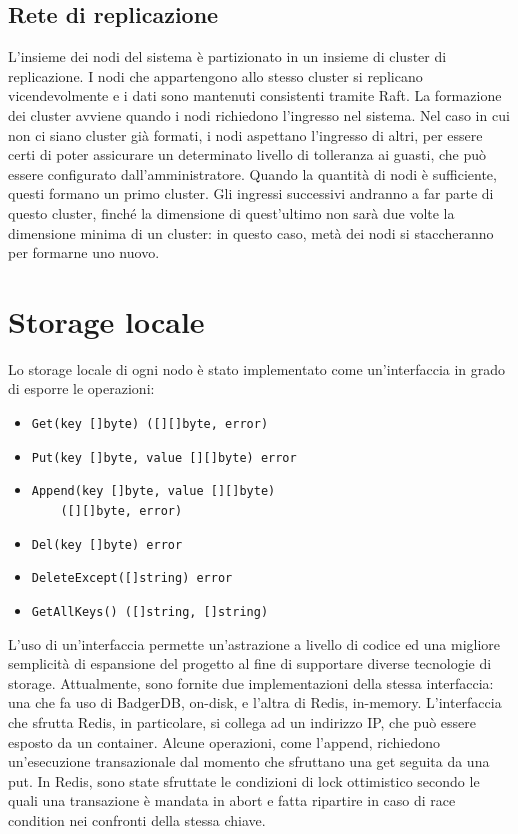 \documentclass[conference]{IEEEtran}
\begin{document}
\subsection{Rete di replicazione}
L'insieme dei nodi del sistema è partizionato in un insieme di cluster di replicazione. I nodi che appartengono allo
stesso cluster si replicano vicendevolmente e i dati sono mantenuti consistenti tramite Raft. La formazione dei cluster
avviene quando i nodi richiedono l'ingresso nel sistema. Nel caso in cui non ci siano cluster già formati, i nodi aspettano
l'ingresso di altri, per essere certi di poter assicurare un determinato livello di tolleranza ai guasti, che può essere
configurato dall'amministratore. Quando la quantità di nodi è sufficiente, questi formano un primo cluster. Gli ingressi successivi
andranno a far parte di questo cluster, finché la dimensione di quest'ultimo non sarà due volte la dimensione minima di un
cluster: in questo caso, metà dei nodi si staccheranno per formarne uno nuovo.

\section{Storage locale}
Lo storage locale di ogni nodo è stato implementato come un'interfaccia in grado di esporre le operazioni:
\begin{itemize}
  \item {\small{\verb!Get(key []byte) ([][]byte, error)!}}
  \item {\small{\verb!Put(key []byte, value [][]byte) error!}}
  \item {\small{\verb!Append(key []byte, value [][]byte)!\\ \verb!    ([][]byte, error)!}}
  \item {\small{\verb!Del(key []byte) error!}}
  \item {\small{\verb!DeleteExcept([]string) error!}}
  \item {\small{\verb!GetAllKeys() ([]string, []string)!}}
\end{itemize}
L'uso di un'interfaccia permette un'astrazione a livello di codice ed una migliore semplicità di espansione del progetto
al fine di supportare diverse tecnologie di storage. Attualmente, sono fornite due implementazioni della stessa interfaccia:
una che fa uso di BadgerDB, on-disk, e l'altra di Redis, in-memory. L'interfaccia che sfrutta Redis, in particolare, si collega ad un indirizzo
IP, che può essere esposto da un container. Alcune operazioni, come l'append, richiedono un'esecuzione transazionale dal
momento che sfruttano una get seguita da una put. In Redis, sono state sfruttate le condizioni di lock ottimistico secondo
le quali una transazione è mandata in abort e fatta ripartire in caso di race condition nei confronti della stessa chiave.
\end{document}
